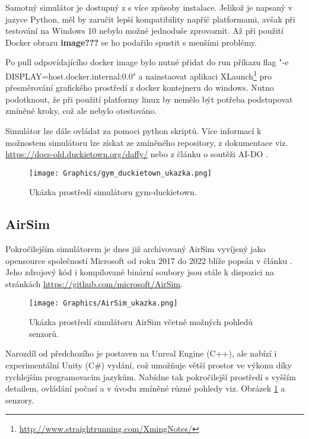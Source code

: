 \documentclass[czech, bc, kky, he, iso690alph]{fasthesis}
\begin{document}
    			Samotný simulátor je dostupný z \cite{gym_duckietown} s více způsoby instalace. Jelikož je napsaný v jazyce Python, měl by zaručit lepší kompatibility napříč platformami, avšak při testování na Windows 10 nebylo možné jednoduše zprovoznit. Až při použití Docker obrazu \textbf{image???} se ho podařilo spustit s menšími problémy.
    			
    			Po pull odpovídajícího docker image bylo nutné přidat do run příkazu flag 
    			\command"-e DISPLAY=host.docker.internal:0.0" a nainstaovat aplikaci XLaunch\footnote{\href{http://www.straightrunning.com/XmingNotes/}{http://www.straightrunning.com/XmingNotes/}} pro přesměrování grafického prostředí z docker kontejneru do windows. Nutno podotknout, že při použití platformy linux by nemělo být potřeba podstupovat zmíněné kroky, což ale nebylo otestováno.
    			
    			Simulátor lze dále ovládat za pomoci python skriptů. Více informací k možnostem simulátoru lze získat ze zmíněného repository, z dokumentace viz. \href{https://docs-old.duckietown.org/daffy/}{https://docs-old.duckietown.org/daffy/} nebo z článku o soutěži AI-DO \cite{AI-DO}.
	    			\begin{figure}[h]
	    				\centering
	    				\texttt{[image: Graphics/gym\_duckietown\_ukazka.png]}
	    				\caption{Ukázka prostředí simulátoru gym-duckietown.}
	    			\end{figure}
    			
    		\subsection{AirSim}
    			Pokročilejším simulátorem je dnes již archivovaný AirSim vyvíjený jako opensource společností Microsoft od roku 2017 do 2022 blíže popsán v článku \cite{airsim_paper}. Jeho zdrojový kód i kompilované binární soubory jsou stále k dispozici na stránkách \href{https://github.com/microsoft/AirSim}{https://github.com/microsoft/AirSim}.
    			
    				\begin{figure}[h]
	    				\centering
	    				\texttt{[image: Graphics/AirSim\_ukazka.png]}
	    				\caption{Ukázka prostředí simulátoru AirSim včetně možných pohledů senzorů.}
	    				\label{pic:AirSim_ukazka}
	    			\end{figure}
    			
    			Narozdíl od předchozího je postaven na Unreal Engine (C++), ale nabízí i experimentální Unity (C\#) vydání, což umožňuje větší prostor ve výkonu díky rychlejším programovacím jazykům. Nabídne tak pokročilejší prostředí s vyšším detailem, ovládání počasí a v úvodu zmíněné různé pohledy viz. Obrázek \ref{pic:AirSim_ukazka} a senzory.
    			
\end{document}
